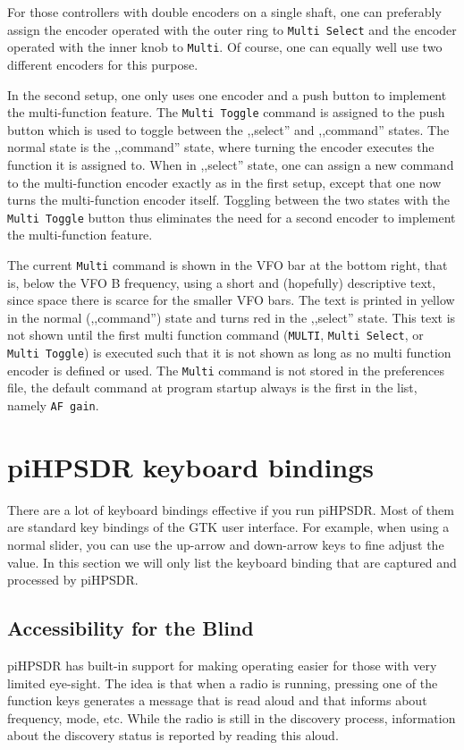 \documentclass[12pt]{book}
\def\bltt#1{\texttt{\color{blue}#1}}
\def\pH{pi\-HPSDR\xspace}
\begin{document}
For those controllers with double encoders on a single shaft, one can preferably assign the encoder
operated with the outer ring  to \bltt{Multi Select} and the encoder operated with the inner
knob to \bltt{Multi}. Of course, one can equally well use two different encoders for this purpose.

In the second setup, one only uses one encoder and a push button to implement the multi-function
feature. The \bltt{Multi Toggle} command is assigned to the push button which is used to toggle
between the ,,select'' and ,,command'' states. The normal state is the ,,command'' state, where
turning the encoder executes the function it is assigned to. When in ,,select'' state, one can
assign a new command to the multi-function encoder exactly as in the first setup, except that
one now turns the multi-function encoder itself. Toggling between the
two states with the \bltt{Multi Toggle} button
thus eliminates the need for a second encoder to implement the multi-function feature.

The current \bltt{Multi} command is shown in the VFO bar at the bottom right, that is, below
the VFO B frequency, using a short and (hopefully) descriptive text, since space there is
scarce for the smaller VFO bars. The text is printed in yellow in the normal (,,command'') state and
turns red in the ,,select'' state. This text is not shown until the first multi function command
(\bltt{MULTI}, \bltt{Multi Select}, or \bltt{Multi Toggle}) is executed such that it is not
shown as long as no multi function encoder is defined or used. The \bltt{Multi} command is not
stored in the preferences file, the default command at program startup always is the first in the list,
namely \bltt{AF gain}.
\chapter[Keyboard bindings]{\pH keyboard bindings}

There are a lot of keyboard bindings effective if you run \pH. Most of them are
standard key bindings of the GTK user interface. For example, when using a normal
slider, you can use the up-arrow and down-arrow keys to fine adjust the value. In this
section we will only list the keyboard binding that are captured and processed by \pH.

\section{Accessibility for the Blind}
\label{sec:accessibility}
\pH has built-in support for making operating easier for those with very limited
eye-sight. The idea is that when a radio is running, pressing one of the function keys generates
a message that
is read aloud and that informs about frequency, mode, etc. While the radio is still in the
discovery process, information about the discovery status is reported by reading this aloud.
\end{document}
